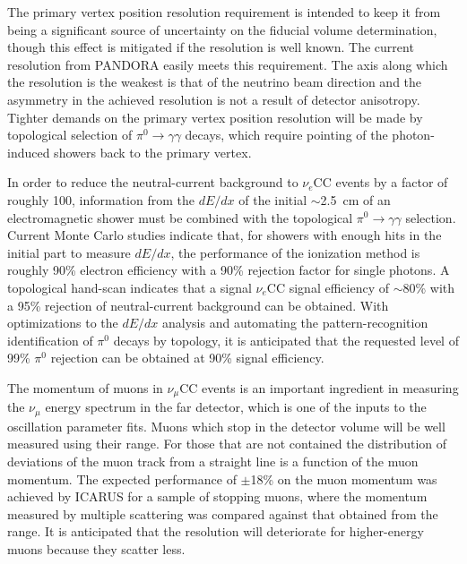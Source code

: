 The primary vertex position resolution requirement is intended 
to keep it from being a significant source of uncertainty on the
fiducial volume determination, though this effect is mitigated if the
resolution is well known.  The current resolution from PANDORA easily
meets this requirement.  The axis along which the resolution is the
weakest is that of the neutrino beam direction and the asymmetry in the
achieved resolution is not a result of detector anisotropy.   Tighter
demands on the primary vertex position resolution will be made by
topological selection of $\pi^0\rightarrow\gamma\gamma$ decays, which
require pointing of the photon-induced showers back to the primary
vertex.

In order to reduce the neutral-current background to $\nu_e$CC events
by a factor of roughly 100, information from the $dE/dx$ of the
initial $\sim$2.5~cm of an electromagnetic shower must be combined
with the topological $\pi^0\rightarrow\gamma\gamma$
selection\cite{docdb-6954}.  Current Monte Carlo studies indicate
that, for showers with enough hits in the initial part to measure
$dE/dx$, the performance of the ionization method is roughly 90\%
electron efficiency with a 90\% rejection factor for single photons.
A topological hand-scan indicates that a signal $\nu_e$CC signal
efficiency of $\sim$80\% with a 95\% rejection of neutral-current
background can be obtained.  With optimizations to the $dE/dx$
analysis and automating the pattern-recognition identification of
$\pi^0$ decays by topology, it is anticipated that the requested level
of 99\% $\pi^0$ rejection can be obtained at 90\% signal efficiency.

The momentum of muons in $\nu_\mu$CC events is an important ingredient
in measuring the $\nu_\mu$ energy spectrum in the far detector, which
is one of the inputs to the oscillation parameter fits.  Muons which
stop in the detector volume will be well measured using their range.
For those that are not contained the distribution of deviations of the
muon track from a straight line is a function of the muon momentum.
The expected performance of $\pm$18\% on the muon momentum was
achieved by ICARUS for a sample of stopping muons, where the momentum
measured by multiple scattering was compared against that obtained
from the range.  It is anticipated that the resolution will
deteriorate for higher-energy muons because they scatter less.

